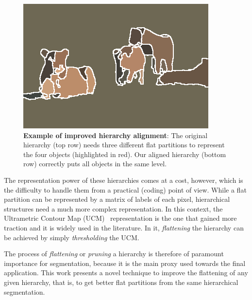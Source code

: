 \begin{figure}
\begin{center}
\begin{minipage}{0.24\linewidth}
\includegraphics[width=\linewidth]{fig/aligned_lions/mcg_our_overseg.png}
\end{minipage}
\end{center}
\vspace{-2mm}
\caption{\textbf{Example of improved hierarchy alignment}: The original hierarchy (top row) needs three
different flat partitions to represent the four objects (highlighted in red).
Our aligned hierarchy (bottom row) correctly puts all objects in the same level.}
\vspace{-2mm}
\label{fig:thresh_seg}
\end{figure}

The representation power of these hierarchies comes at a cost, however, which is the
difficulty to handle them from a practical (coding) point of view.
While a flat partition can be represented by a matrix of labels of each pixel,
hierarchical structures need a much more complex representation. 
In this context, the Ultrametric Contour Map (UCM)~\cite{arbelaez2011contour} representation is the one that 
gained more traction and it is widely used in the literature.
In it, \textit{flattening} the hierarchy can be achieved by simply \textit{thresholding} the UCM.

The process of \textit{flattening} or \textit{pruning} a hierarchy is therefore of paramount importance for
segmentation, because it is the main proxy used towards the final application.
This work presents a novel technique to improve the flattening of any given hierarchy, that is, 
to get better flat partitions from the same hierarchical segmentation.

